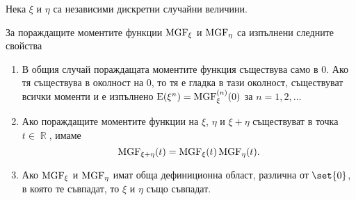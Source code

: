 \documentclass{../../common/topic}
\begin{document}
\begin{theorem}\label{thm:mgf_properties}
  Нека \( \xi \) и \( \eta \) са независими дискретни случайни величини.

  За пораждащите моментите функции \( \operatorname{MGF}_\xi \) и \( \operatorname{MGF}_\eta \) са изпълнени следните свойства
  \begin{enumerate}
    \item В общия случай пораждащата моментите функция съществува само в \( 0 \). Ако тя съществува в околност на \( 0 \), то тя е гладка в тази околност, съществуват всички моменти и е изпълнено \( \operatorname{E}(\xi^n) = \operatorname{MGF}_\xi^{(n)} (0) \) за \( n = 1, 2, \ldots \)

    \item Ако пораждащите моментите функции на \( \xi \), \( \eta \) и \( \xi + \eta \) съществуват в точка \( t \in \BbbR \), имаме
    \begin{equation*}
      \operatorname{MGF}_{\xi + \eta}(t) = \operatorname{MGF}_\xi(t) \operatorname{MGF}_\eta(t).
    \end{equation*}

    \item Ако \( \operatorname{MGF}_\xi \) и \( \operatorname{MGF}_\eta \) имат обща дефиниционна област, различна от \( \set{ 0 } \), в която те съвпадат, то \( \xi \) и \( \eta \) също съвпадат.
  \end{enumerate}
\end{theorem}
\end{document}
